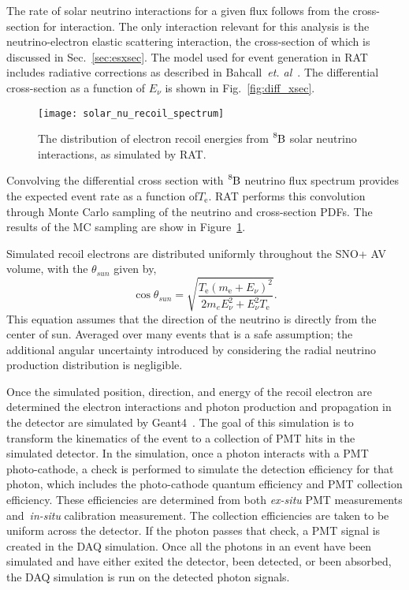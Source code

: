 The rate of solar neutrino interactions for a given flux follows from the cross-section for
interaction. The only interaction relevant for this analysis is the
neutrino-electron elastic scattering interaction, the cross-section of which
is discussed in Sec.~\ref{sec:esxsec}.
The model used for event generation in RAT includes radiative corrections as
described in Bahcall~\textit{et. al}~\citep{escrosssec}.
The differential cross-section as a function of $E_{\nu}$ is shown in Fig.~\ref{fig:diff_xsec}.

\begin{figure}[htbp]
  \centering
  \texttt{[image: solar\_nu\_recoil\_spectrum]}
  \caption[Solar Recoil Electron Spectrum]{
      The distribution of electron recoil energies from $\ce{^{8}B}$ solar neutrino
      interactions, as simulated by RAT\@.}
    \label{fig:recoil_spectrum}
\end{figure}

Convolving the differential cross section with $\ce{^{8}B}$ neutrino flux
spectrum provides the expected event rate as a function of$T_{\mathrm{e}}$. 
RAT performs this convolution through Monte Carlo sampling of the neutrino
and cross-section PDFs.
The results of the MC sampling are show in Figure~\ref{fig:recoil_spectrum}.

Simulated recoil electrons are distributed uniformly throughout the SNO+ AV volume, with
the $\theta_{sun}$ given by,
\begin{equation}
  \cos\theta_{sun} = \sqrt{\dfrac{T_{\mathrm{e}}(m_{\mathrm{e}}+E_{\nu})^{2}}{2m_{e}E_{\nu}^{2} + E_{\nu}^{2}T_{\mathrm{e}}}}\text{.}
  \label{eqn:costheta_te}
\end{equation}
This equation assumes that the direction of the neutrino is directly from the center of sun.
Averaged over many events that is a safe assumption; the additional angular uncertainty
introduced by considering the radial neutrino production distribution is negligible.

Once the simulated position, direction, and energy of the recoil electron are determined  the
electron interactions and  photon production and propagation in the detector are simulated
by Geant4~\citep{geant4}.
The goal of this simulation is to transform the kinematics of the event to
a collection of PMT hits in the simulated detector.
In the simulation, once a photon interacts with a PMT photo-cathode, a check is performed
to simulate the detection efficiency for that photon, which includes the photo-cathode quantum efficiency and
PMT collection efficiency.
These efficiencies are determined from both \textit{ex-situ} PMT measurements
and~\textit{in-situ} calibration measurement.
The collection efficiencies are
taken to be uniform across the detector. %
If the photon passes that check, a PMT signal is created in the DAQ simulation.
Once all the photons in an event have been simulated and have either exited the detector,
been detected, or been absorbed, the DAQ simulation is run on the detected photon signals.

